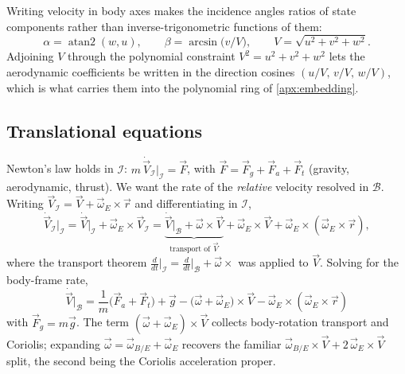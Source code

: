 \begin{remark}
Writing velocity in body axes makes the incidence angles ratios of state
components rather than inverse-trigonometric functions of them:
\begin{equation}
\label{eq:apx_incidence}
\alpha=\operatorname{atan2}(w,u),\qquad
\beta=\arcsin\!\bigl(v/V\bigr),\qquad
V=\sqrt{u^2+v^2+w^2}.
\end{equation}
Adjoining $V$ through the polynomial constraint $V^2=u^2+v^2+w^2$ lets the
aerodynamic coefficients be written in the direction cosines
$(u/V,\,v/V,\,w/V)$, which is what carries them into the polynomial ring of
\cref{apx:embedding}.
\end{remark}

\subsection{Translational equations}
\label{sub:apx_translational}

Newton's law holds in $\mathcal I$: $m\,\dot{\vec V}_{\mathcal I}\big|_{\mathcal I}=\vec F$,
with $\vec F=\vec F_g+\vec F_a+\vec F_t$ (gravity, aerodynamic, thrust).
We want the rate of the \emph{relative} velocity resolved in $\mathcal B$.
Writing $\vec V_{\mathcal I}=\vec V+\vec\omega_E\times\vec r$ and
differentiating in $\mathcal I$,
\begin{equation}
\dot{\vec V}_{\mathcal I}\big|_{\mathcal I}
=\dot{\vec V}\big|_{\mathcal I}+\vec\omega_E\times\vec V_{\mathcal I}
=\underbrace{\dot{\vec V}\big|_{\mathcal B}+\vec\omega\times\vec V}_{\text{transport of }\vec V}
+\vec\omega_E\times\vec V+\vec\omega_E\times(\vec\omega_E\times\vec r),
\end{equation}
where the transport theorem $\tfrac{d}{dt}\big|_{\mathcal I}=\tfrac{d}{dt}\big|_{\mathcal B}+\vec\omega\times$
was applied to $\vec V$. Solving for the body-frame rate,
\begin{equation}
\label{eq:apx_trans_vector}
\boxed{\;
\dot{\vec V}\big|_{\mathcal B}
=\frac{1}{m}\bigl(\vec F_a+\vec F_t\bigr)+\vec g
-\bigl(\vec\omega+\vec\omega_E\bigr)\times\vec V
-\vec\omega_E\times(\vec\omega_E\times\vec r)\; }
\end{equation}
with $\vec F_g=m\vec g$. The term $(\vec\omega+\vec\omega_E)\times\vec V$
collects body-rotation transport and Coriolis; expanding
$\vec\omega=\vec\omega_{B/E}+\vec\omega_E$ recovers the familiar
$\vec\omega_{B/E}\times\vec V+2\,\vec\omega_E\times\vec V$ split, the second
being the Coriolis acceleration proper.

